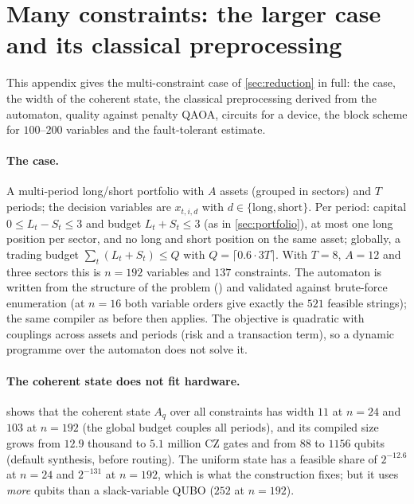 \section{Many constraints: the larger case and its classical preprocessing}\label{sec:large}
This appendix gives the multi-constraint case of \cref{sec:reduction} in full: the case, the width of the coherent state, the classical preprocessing derived from the automaton, quality against penalty QAOA, circuits for a device, the block scheme for $100$--$200$ variables and the fault-tolerant estimate.

\paragraph{The case.} A multi-period long/short portfolio with $A$ assets (grouped in sectors) and $T$ periods; the decision variables are $x_{t,i,d}$ with $d\in\{\mathrm{long},\mathrm{short}\}$. Per period: capital $0\le L_t-S_t\le3$ and budget $L_t+S_t\le3$ (as in \cref{sec:portfolio}), at most one long position per sector, and no long and short position on the same asset; globally, a trading budget $\sum_t(L_t+S_t)\le Q$ with $Q=\lceil 0.6\cdot3T\rceil$. With $T=8$, $A=12$ and three sectors this is $n=192$ variables and $137$ constraints. The automaton is written from the structure of the problem () and validated against brute-force enumeration (at $n=16$ both variable orders give exactly the $521$ feasible strings); the same compiler as before then applies. The objective is quadratic with couplings across assets and periods (risk and a transaction term), so a dynamic programme over the automaton does not solve it.

\paragraph{The coherent state does not fit hardware.}  shows that the coherent state $A_q$ over all constraints has width $11$ at $n=24$ and $103$ at $n=192$ (the global budget couples all periods), and its compiled size grows from $12.9$ thousand to $5.1$ million CZ gates and from $88$ to $1156$ qubits (default synthesis, before routing). The uniform state has a feasible share of $2^{-12.6}$ at $n=24$ and $2^{-131}$ at $n=192$, which is what the construction fixes; but it uses \emph{more} qubits than a slack-variable QUBO ($252$ at $n=192$).



